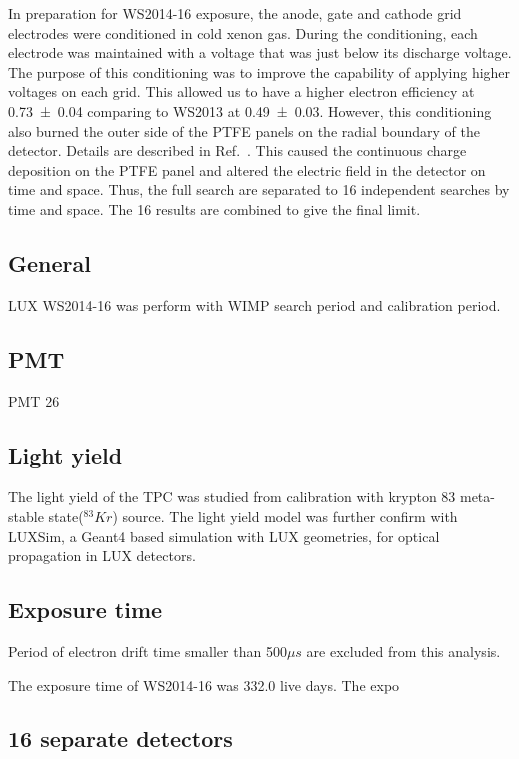 In preparation for WS2014-16 exposure, the anode, gate and cathode grid electrodes were conditioned in cold xenon gas. During the conditioning, each electrode was maintained with a voltage that was just below its discharge voltage. The purpose of this conditioning was to improve the capability of applying higher voltages on each grid. This allowed us to have a higher electron efficiency at \num[separate-uncertainty=false]{0.73 \pm .04} comparing to WS2013 at \num[separate-uncertainty=false]{0.49 \pm 0.03}. However, this conditioning also burned the outer side of the PTFE panels on the radial boundary of the detector. Details are described in Ref.~\cite{Akerib2017f}. This caused the continuous charge deposition on the PTFE panel and altered the electric field in the detector on time and space. Thus, the full search are separated to 16 independent searches by time and space. The 16 results are combined to give the final limit.     

\subsection{General}
LUX WS2014-16 was perform with WIMP search period and calibration period.
 
\subsection{PMT}
PMT 26


\subsection{Light yield}
The light yield of the TPC was studied from calibration with krypton 83 meta-stable state($^{83}Kr$) source. The light yield model was further confirm with LUXSim, a Geant4 based simulation with LUX geometries, for optical propagation in LUX detectors. 

\subsection{Exposure time}
Period of electron drift time smaller than 500$\mu s$ are excluded from this analysis.

The exposure time of WS2014-16 was 332.0 live days. The expo

\subsection{16 separate detectors}

